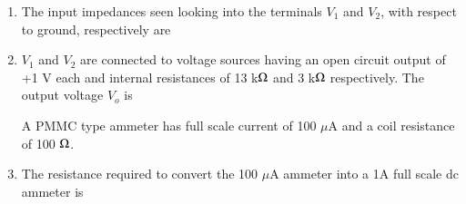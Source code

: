 \documentclass[journal,12pt,onecolumn]{IEEEtran}
\theoremstyle{remark}
\begin{document}
\begin{enumerate}
\item The input impedances seen looking into the terminals $V_1$ and $V_2$, with respect to ground, respectively are
\hfill{}\begin{enumerate}  \end{enumerate}

\item $V_1$ and $V_2$ are connected to voltage sources having an open circuit output of +1 V each and internal resistances of 13 k$\ohm$ and 3 k$\ohm$ respectively. The output voltage $V_o$ is
\hfill{}\begin{enumerate}  \end{enumerate}

A PMMC type ammeter has full scale current of 100 $\mu$A and a coil resistance of 100 $\ohm$.

\item The resistance required to convert the 100 $\mu$A ammeter into a 1A full scale dc ammeter is

\hfill{}
\begin{enumerate} 
 \end{enumerate}


\end{enumerate}
\end{document}
